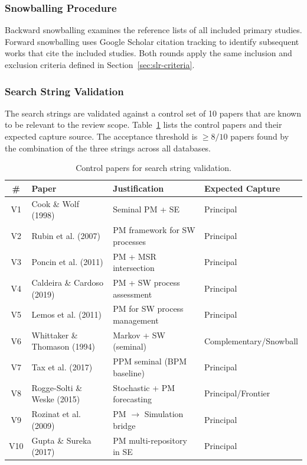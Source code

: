 \subsubsection{Snowballing Procedure}

Backward snowballing examines the reference lists of all included primary studies. Forward snowballing uses Google Scholar citation tracking to identify subsequent works that cite the included studies. Both rounds apply the same inclusion and exclusion criteria defined in Section~\ref{sec:slr-criteria}.

\subsubsection{Search String Validation}

The search strings are validated against a control set of 10 papers that are known to be relevant to the review scope. Table~\ref{tab:validation-set} lists the control papers and their expected capture source. The acceptance threshold is $\geq 8/10$ papers found by the combination of the three strings across all databases.

\begin{table}[htbp]
\centering
\caption{Control papers for search string validation.}
\label{tab:validation-set}
\small
\begin{tabular}{clll}
\toprule
\textbf{\#} & \textbf{Paper} & \textbf{Justification} & \textbf{Expected Capture} \\
\midrule
V1 & Cook \& Wolf (1998) & Seminal PM + SE & Principal \\
V2 & Rubin et al. (2007) & PM framework for SW processes & Principal \\
V3 & Poncin et al. (2011) & PM + MSR intersection & Principal \\
V4 & Caldeira \& Cardoso (2019) & PM + SW process assessment & Principal \\
V5 & Lemos et al. (2011) & PM for SW process management & Principal \\
V6 & Whittaker \& Thomason (1994) & Markov + SW (seminal) & Complementary/Snowball \\
V7 & Tax et al. (2017) & PPM seminal (BPM baseline) & Principal \\
V8 & Rogge-Solti \& Weske (2015) & Stochastic + PM forecasting & Principal/Frontier \\
V9 & Rozinat et al. (2009) & PM $\rightarrow$ Simulation bridge & Principal \\
V10 & Gupta \& Sureka (2017) & PM multi-repository in SE & Principal \\
\bottomrule
\end{tabular}
\end{table}


